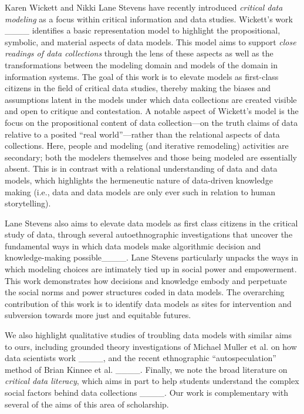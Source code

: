Karen Wickett and Nikki Lane Stevens have recently introduced \emph{critical data modeling} as a focus within critical information and data studies.
Wickett's work ____ identifies a basic representation model to highlight the propositional, symbolic, and material aspects of data models. This model aims to support \emph{close readings of data collections} through the lens of these aspects as well as the transformations between the modeling domain and models of the domain in information systems.  The goal of this work is to elevate models as first-class citizens in the field of critical data studies, thereby making the biases and assumptions latent in the models under which data collections are created visible and open to critique and contestation.  A notable aspect of Wickett's model is 
the focus on the propositional content of data collection---on the truth claims of data relative to a posited ``real world''---rather than the relational aspects of data collections.  Here, people and modeling (and iterative remodeling) activities are secondary; both the modelers themselves and those being modeled are essentially absent.  This is in contrast with a relational understanding of data and data models, which highlights the hermeneutic nature of data-driven knowledge making (i.e., data and data models are only ever such in relation to human storytelling).

Lane Stevens also aims to elevate data models as first class citizens in the critical study of data, through several autoethnographic investigations that uncover the fundamental ways in which data models make algorithmic decision and knowledge-making possible____. Lane Stevens particularly unpacks the ways in which modeling choices are intimately tied up in social power and empowerment.  This work demonstrates how decisions and knowledge embody and perpetuate the social norms and power structures coded in data models.  The overarching contribution of this work is to identify data models as sites for intervention and subversion towards more just and equitable futures.  

We also highlight qualitative studies of troubling data models with similar aims to ours, including grounded theory investigations of Michael Muller et al. on how data scientists work ____, and the recent ethnographic ``autospeculation'' method of Brian Kinnee et al. ____.  
Finally, we note the broad literature on \emph{critical data literacy}, which aims in part to help students understand the complex social factors behind data collections  
____.  Our work is complementary with several of the aims of this area of scholarship.


